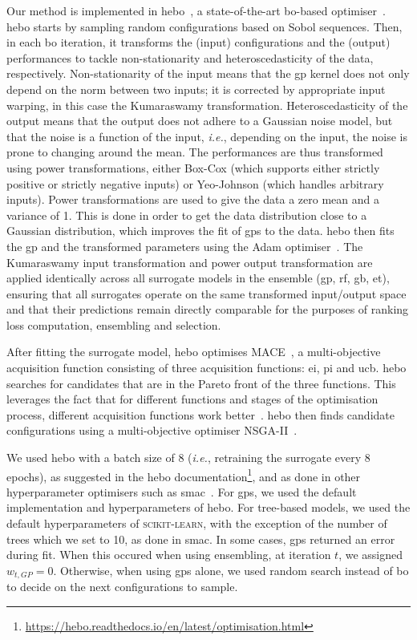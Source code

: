 Our method is implemented in \gls{hebo}~\citep{CowEtAl22}, a state-of-the-art \gls{bo}-based optimiser~\citep{EggEtAl21}.
\gls{hebo} starts by sampling random configurations based on Sobol sequences.
Then, in each \gls{bo} iteration, it transforms the (input) configurations and the (output) performances to tackle non-stationarity and heteroscedasticity of the data, respectively.
Non-stationarity of the input means that the \gls{gp} kernel does not only depend on the norm between two inputs; it is corrected by appropriate input warping, in this case the Kumaraswamy transformation.
Heteroscedasticity of the output means that the output does not adhere to a Gaussian noise model, but that the noise is a function of the input, \emph{i.e.}, depending on the input, the noise is prone to changing around the mean.
The performances are thus transformed using power transformations, either Box-Cox (which supports either strictly positive or strictly negative inputs) or Yeo-Johnson (which handles arbitrary inputs).
Power transformations are used to give the data a zero mean and a variance of 1.
This is done in order to get the data distribution close to a Gaussian distribution, which improves the fit of \glspl{gp} to the data.
\gls{hebo} then fits the \gls{gp} and the transformed parameters using the Adam optimiser~\citep{KinBa15}.
The Kumaraswamy input transformation and power output transformation are applied identically across all surrogate models in the ensemble (\gls{gp}, \gls{rf}, \gls{gb}, \gls{et}), ensuring that all surrogates operate on the same transformed input/output space and that their predictions remain directly comparable for the purposes of ranking loss computation, ensembling and selection.

After fitting the surrogate model, \gls{hebo} optimises MACE~\citep{LyuEtAl18}, a multi-objective acquisition function consisting of three acquisition functions: \gls{ei}, \gls{pi} and \gls{ucb}.
\gls{hebo} searches for candidates that are in the Pareto front of the three functions.
This leverages the fact that for different functions and stages of the optimisation process, different acquisition functions work better~\citep{BenEtAl22c}.
\gls{hebo} then finds candidate configurations using a multi-objective optimiser NSGA-II~\citep{DebEtAl02}.

We used \gls{hebo} with a batch size of 8 (\emph{i.e.}, retraining the surrogate every 8 epochs), as suggested in the \gls{hebo} documentation\footnote{\url{https://hebo.readthedocs.io/en/latest/optimisation.html}}, and as done in other hyperparameter optimisers such as \gls{smac}~\citep{LinEtAl19}.
For \glspl{gp}, we used the default implementation and hyperparameters of \gls{hebo}.
For tree-based models, we used the default hyperparameters of \textsc{scikit-learn}, with the exception of the number of trees which we set to 10, as done in \gls{smac}.
In some cases, \glspl{gp} returned an error during fit. When this occured when using ensembling, at iteration $t$, we assigned $w_{t,GP} = 0$.
Otherwise, when using \glspl{gp} alone, we used random search instead of \gls{bo} to decide on the next configurations to sample.

